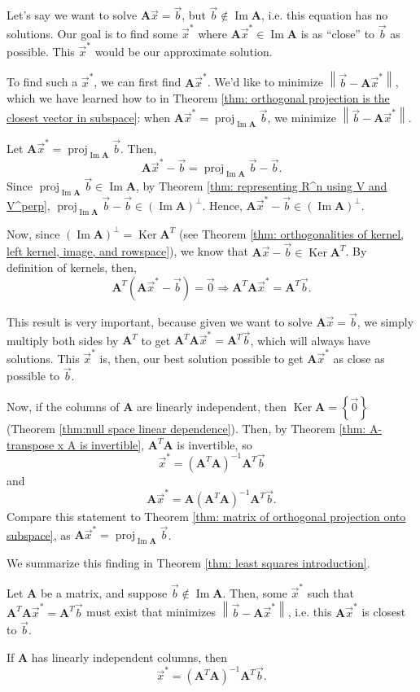 \documentclass[]{book}
\DeclareMathOperator{\proj}{proj}
\DeclareMathOperator{\image}{Im}
\DeclareMathOperator{\kernel}{Ker}
\newcommand{\mat}[1]{\ensuremath{\mathbf{#1}}}
\begin{document}
Let's say we want to solve $\mat{A}\vec{x} = \vec{b}$, but $\vec{b} \notin \image\mat{A}$, i.e. this equation has no solutions. Our goal is to find some $\vec{x}^*$ where $\mat{A}\vec{x}^* \in \image\mat{A}$ is as ``close'' to $\vec{b}$ as possible. This $\vec{x}^*$ would be our approximate solution.

To find such a $\vec{x}^*$, we can first find $\mat{A}\vec{x}^*$. We'd like to minimize $\left\|\vec{b} - \mat{A}\vec{x}^*\right\|$, which we have learned how to in Theorem \ref{thm: orthogonal projection is the closest vector in subspace}: when $\mat{A}\vec{x}^*  = \proj_{\image\mat{A}} \vec{b}$, we minimize $\left\|\vec{b} - \mat{A}\vec{x}^*\right\|$.

Let $\mat{A}\vec{x}^* = \proj_{\image\mat{A}}\vec{b}$. Then,
\[\mat{A}\vec{x}^* - \vec{b} = \proj_{\image\mat{A}}\vec{b} - \vec{b}.\]
Since $\proj_{\image\mat{A}}\vec{b} \in \image\mat{A}$, by Theorem \ref{thm: representing R^n using V and V^perp}, $\proj_{\image\mat{A}}\vec{b} - \vec{b} \in \left(\image\mat{A}\right)^{\perp}$. Hence, $\mat{A}\vec{x}^* - \vec{b} \in \left(\image\mat{A}\right)^{\perp}$.

Now, since $\left(\image\mat{A}\right)^{\perp} = \kernel\mat{A}^T$ (see Theorem \ref{thm: orthogonalities of kernel, left kernel, image, and rowspace}), we know that $\mat{A}\vec{x} - \vec{b} \in \kernel\mat{A}^T$. By definition of kernels, then,
\[\mat{A}^T\left(\mat{A}\vec{x}^* - \vec{b}\right) = \vec{0} \Longrightarrow \mat{A}^T\mat{A}\vec{x}^* = \mat{A}^T\vec{b}.\]

This result is very important, because given we want to solve $\mat{A}\vec{x} = \vec{b}$, we simply multiply both sides by $\mat{A}^T$ to get $\mat{A}^T\mat{A}\vec{x}^* = \mat{A}^T\vec{b}$, which will always have solutions. This $\vec{x}^*$ is, then, our best solution possible to get $\mat{A}\vec{x}^*$ as close as possible to $\vec{b}$.

Now, if the columns of $\mat{A}$ are linearly independent, then $\kernel\mat{A} = \left\{\vec{0}\right\}$ (Theorem \ref{thm:null space linear dependence}). Then, by Theorem \ref{thm: A-transpose x A is invertible}, $\mat{A}^T\mat{A}$ is invertible, so
\[\vec{x}^* = \left(\mat{A}^T\mat{A}\right)^{-1}\mat{A}^T\vec{b}\] and \[\mat{A}\vec{x}^* = \mat{A}\left(\mat{A}^T\mat{A}\right)^{-1}\mat{A}^T\vec{b}.\] Compare this statement to Theorem \ref{thm: matrix of orthogonal projection onto subspace}, as $\mat{A}\vec{x}^* = \proj_{\image\mat{A}}\vec{b}$.

We summarize this finding in Theorem \ref{thm: least squares introduction}.
\begin{theorem}
    \label{thm: least squares introduction}
    Let $\mat{A}$ be a matrix, and suppose $\vec{b} \notin \image\mat{A}$. Then, some $\vec{x}^*$ such that $\mat{A}^T\mat{A}\vec{x}^* = \mat{A}^T\vec{b}$ must exist that minimizes $\left\|\vec{b} - \mat{A}\vec{x}^*\right\|$, i.e. this $\mat{A}\vec{x}^*$ is closest to $\vec{b}$. 
    
    If $\mat{A}$ has linearly independent columns, then
    \[\vec{x}^* = \left(\mat{A}^T\mat{A}\right)^{-1}\mat{A}^T\vec{b}.\]
\end{theorem}
\end{document}
